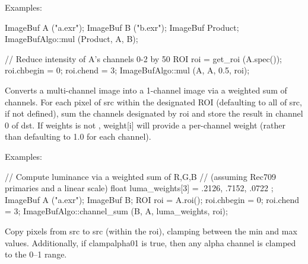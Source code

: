 \smallskip
\noindent Examples:
\begin{code}
    ImageBuf A ("a.exr");
    ImageBuf B ("b.exr");
    ImageBuf Product;
    ImageBufAlgo::mul (Product, A, B);

    // Reduce intensity of A's channels 0-2 by 50%
    ROI roi = get_roi (A.spec());
    roi.chbegin = 0;  roi.chend = 3;
    ImageBufAlgo::mul (A, A, 0.5, roi);
\end{code}
\apiend


 
Converts a multi-channel image into a 1-channel image via a weighted sum
of channels.  For each pixel of {\cf src} within the designated ROI
(defaulting to all of {\cf src}, if not defined), sum the channels
designated by {\cf roi} and store the result in channel 0 of {\cf dst}.
If {\cf weights} is not \NULL, {\cf weight[i]} will provide a
per-channel weight (rather than defaulting to 1.0 for each channel).

\smallskip
\noindent Examples:
\begin{code}
    // Compute luminance via a weighted sum of R,G,B
    // (assuming Rec709 primaries and a linear scale)
    float luma_weights[3] = { .2126, .7152, .0722 };
    ImageBuf A ("a.exr");
    ImageBuf B;
    ROI roi = A.roi();
    roi.chbegin = 0;  roi.chend = 3;
    ImageBufAlgo::channel_sum (B, A, luma_weights, roi);
\end{code}
\apiend


 

Copy pixels from {\cf src} to {\cf src} (within the {\cf roi}), clamping
between the {\cf min} and {\cf max} values.  Additionally, if
{\cf clampalpha01} is {\cf true}, then any alpha 
channel is clamped to the 0--1 range.

